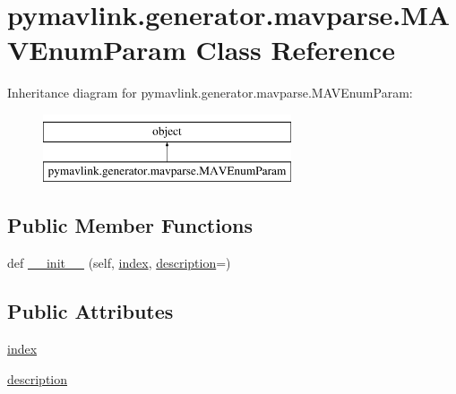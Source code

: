 \hypertarget{classpymavlink_1_1generator_1_1mavparse_1_1MAVEnumParam}{}\section{pymavlink.\+generator.\+mavparse.\+M\+A\+V\+Enum\+Param Class Reference}
\label{classpymavlink_1_1generator_1_1mavparse_1_1MAVEnumParam}
Inheritance diagram for pymavlink.\+generator.\+mavparse.\+M\+A\+V\+Enum\+Param\+:\begin{figure}[H]
\begin{center}
\leavevmode
\includegraphics[height=2.000000cm]{classpymavlink_1_1generator_1_1mavparse_1_1MAVEnumParam}
\end{center}
\end{figure}
\subsection*{Public Member Functions}
\begin{DoxyCompactItemize}
\item 
def \mbox{\hyperlink{classpymavlink_1_1generator_1_1mavparse_1_1MAVEnumParam_ac3a735f2ba9331912edbb1cf561a0825}{\+\_\+\+\_\+init\+\_\+\+\_\+}} (self, \mbox{\hyperlink{classpymavlink_1_1generator_1_1mavparse_1_1MAVEnumParam_aa2db535fa7a3fd9f682b56a65cf09e9e}{index}}, \mbox{\hyperlink{classpymavlink_1_1generator_1_1mavparse_1_1MAVEnumParam_a0a2a311f9a7f965600b077e7ba3a3e1e}{description}}=\textquotesingle{}\textquotesingle{})
\end{DoxyCompactItemize}
\subsection*{Public Attributes}
\begin{DoxyCompactItemize}
\item 
\mbox{\hyperlink{classpymavlink_1_1generator_1_1mavparse_1_1MAVEnumParam_aa2db535fa7a3fd9f682b56a65cf09e9e}{index}}
\item 
\mbox{\hyperlink{classpymavlink_1_1generator_1_1mavparse_1_1MAVEnumParam_a0a2a311f9a7f965600b077e7ba3a3e1e}{description}}
\end{DoxyCompactItemize}


